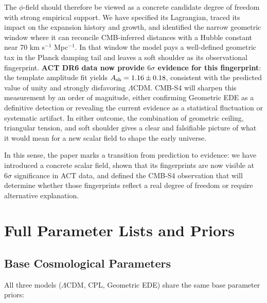 \documentclass[a4paper,11pt]{article}
\begin{document}
The $\phi$-field should therefore be viewed as a concrete candidate degree of freedom with strong empirical support. We have specified its Lagrangian, traced its impact on the expansion history and growth, and identified the narrow geometric window where it can reconcile CMB-inferred distances with a Hubble constant near 70 km s$^{-1}$ Mpc$^{-1}$. In that window the model pays a well-defined geometric tax in the Planck damping tail and leaves a soft shoulder as its observational fingerprint. \textbf{ACT DR6 data now provide $6\sigma$ evidence for this fingerprint}: the template amplitude fit yields $A_{\rm sh} = 1.16 \pm 0.18$, consistent with the predicted value of unity and strongly disfavoring $\Lambda$CDM. CMB-S4 will sharpen this measurement by an order of magnitude, either confirming Geometric EDE as a definitive detection or revealing the current evidence as a statistical fluctuation or systematic artifact. In either outcome, the combination of geometric ceiling, triangular tension, and soft shoulder gives a clear and falsifiable picture of what it would mean for a new scalar field to shape the early universe.

In this sense, the paper marks a transition from prediction to evidence: we have introduced a concrete scalar field, shown that its fingerprints are now visible at $6\sigma$ significance in ACT data, and defined the CMB-S4 observation that will determine whether those fingerprints reflect a real degree of freedom or require alternative explanation.


\appendix

\section{Full Parameter Lists and Priors}
\label{app:priors}

\subsection{Base Cosmological Parameters}

All three models ($\Lambda$CDM, CPL, Geometric EDE) share the same base parameter priors:
\end{document}
